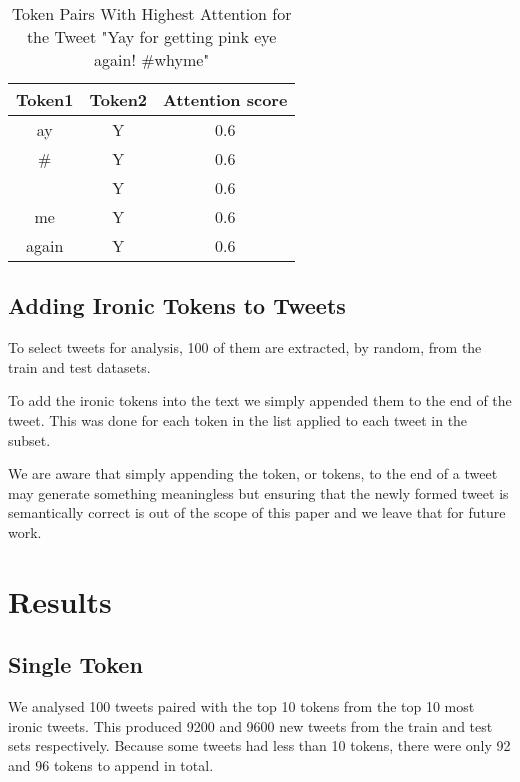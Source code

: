 \documentclass[10pt, a4paper]{article}
\begin{document}
\begin{table*}
\caption{Token Pairs With Highest Attention for the Tweet "Yay for getting pink eye again!  \#whyme"}
\label{tab:attention-tokens-pairs}
\begin{center}
\begin{tabular}{c|c|c}
\toprule
Token1 & Token2 & Attention score\\
\midrule
ay                  & Y & 0.6 \\
\#                  & Y & 0.6 \\
\textvisiblespace   & Y & 0.6 \\
me                  & Y & 0.6 \\
again               & Y & 0.6 \\
\bottomrule
\end{tabular}
\end{center}
\end{table*}

\subsection{Adding Ironic Tokens to Tweets}

To select tweets for analysis, 100 of them are extracted, by random, from the train and test datasets.

To add the ironic tokens into the text we simply appended them to the end of the tweet. This was done for each token in the list applied to each tweet in the subset.

We are aware that simply appending the token, or tokens, to the end of a tweet may generate something meaningless but ensuring that the newly formed tweet is semantically correct is out of the scope of this paper and we leave that for future work.

\section{Results}

\subsection{Single Token}

We analysed 100 tweets paired with the top 10 tokens from the top 10 most ironic tweets.
This produced 9200 and 9600 new tweets from the train and test sets respectively.
Because some tweets had less than 10 tokens, there were only 92 and 96 tokens to append in total.
\end{document}
